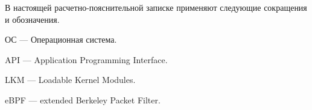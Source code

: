 
В настоящей расчетно-пояснительной записке применяют следующие сокращения и обозначения.\\

\begin{description}[leftmargin=0pt]
	\item \noindent ОС --- Операционная система.
	\item \noindent API --- Application Programming Interface.
	\item \noindent LKM --- Loadable Kernel Modules.
	\item \noindent eBPF --- extended Berkeley Packet Filter.
\end{description}
